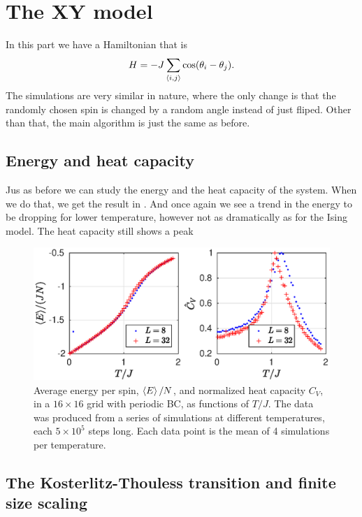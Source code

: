 \documentclass[11pt,letter, swedish, english
]{article}
\begin{document}
\section{The XY model}
In this part we have a Hamiltonian that is
\begin{equation}
H = -J\sum_{\ev{i, j}} \cos(\theta_i - \theta_j).
\end{equation}
The simulations are very similar in nature, where the only change is
that the randomly chosen spin is changed by a random angle instead of
just fliped. Other than that, the main algorithm is just the same as
before. 


\subsection{Energy and heat capacity}
Jus as before we can study the energy and the heat capacity of the
system. When we do that, we get the result in . And
once again we see a trend in the energy to be dropping for lower
temperature, however not as dramatically as for the Ising model. 
The heat capacity still shows a peak

\begin{figure}
\centering
\includegraphics[width=1\textwidth]{XY_ECV_L-8-32_Nsteps-64.eps}
\caption{Average energy per spin, $\ev{E}/N$, and normalized heat
  capacity $C_V$, in a $16\times16$ grid with periodic BC, as
  functions of $T/J$. The data was produced from a series of
  simulations at different temperatures, each $5\times10^5$ steps
  long. Each data point is the mean of 4 simulations per
  temperature. } 
\label{fig:ECV2}
\end{figure}


\subsection{The Kosterlitz-Thouless transition and finite size scaling}
\end{document}

